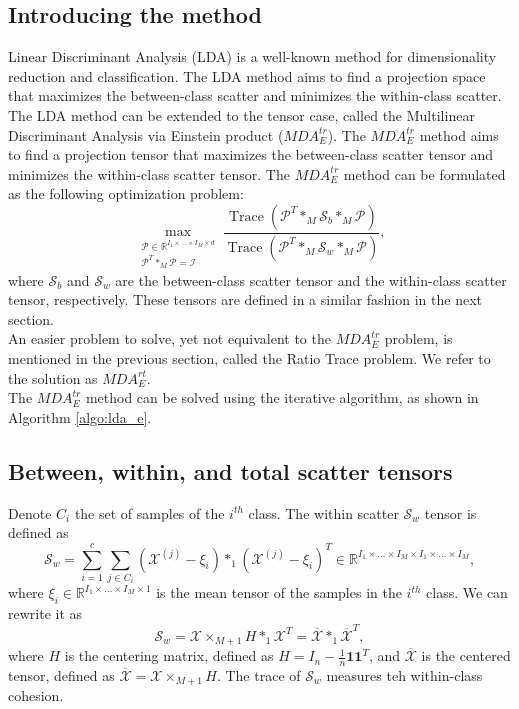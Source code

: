 \documentclass{siamltex}
\begin{document}
\subsection{Introducing the method}
Linear Discriminant Analysis (LDA) is a well-known method for dimensionality reduction and classification. The LDA method aims to find a projection space that maximizes the between-class scatter and minimizes the within-class scatter. The LDA method can be extended to the tensor case, called the Multilinear Discriminant Analysis via Einstein product ($MDA_E^{tr}$). The $MDA_E^{tr}$ method aims to find a projection tensor that maximizes the between-class scatter tensor and minimizes the within-class scatter tensor. The $MDA_E^{tr}$ method can be formulated as the following optimization problem:
\begin{equation}
\label{eq:lda_e}
\max_{\substack{\mathcal{P} \in \mathbb{R}^{I_1 \times \ldots \times I_M \times d}\\ \mathcal{P}^T *_M \mathcal{P}=\mathcal{I}}}\frac{\operatorname{Trace}(\mathcal{P}^T *_M \mathcal{S}_b *_M \mathcal{P})}{\operatorname{Trace}(\mathcal{P}^T *_M \mathcal{S}_w *_M \mathcal{P})},
\end{equation}
where $\mathcal{S}_b$ and $\mathcal{S}_w$ are the between-class scatter tensor and the within-class scatter tensor, respectively. These tensors are defined in a similar fashion in the next section.\\
An easier problem to solve, yet not equivalent to the $MDA_E^{tr}$ problem, is mentioned in the previous section, called the Ratio Trace problem. We refer to the solution as $MDA_E^{rt}$.\\
The $MDA_E^{tr}$ method can be solved using the iterative algorithm, as shown in Algorithm \ref{algo:lda_e}.
%
\subsection{Between, within, and total scatter tensors}
Denote $C_i$ the set of samples of the $i^{th}$ class. The within scatter $\mathcal{S}_w$ tensor is defined as
\begin{equation}
\mathcal{S}_w=\sum_{i=1}^{c} \sum_{j\in C_i} (\mathcal{X}^{(j)}-\xi_i) *_1 (\mathcal{X}^{(j)}-\xi_i)^T \in \mathbb{R}^{I_1 \times \ldots \times I_M \times I_1 \times \ldots \times I_M},
\end{equation}
where $\xi_i \in \mathbb{R}^{I_1 \times \ldots \times I_M \times 1}$ is the mean tensor of the samples in the $i^{th}$ class. We can rewrite it as
\begin{equation}
\mathcal{S}_w= \mathcal{X} \times_{M+1} H *_1 \mathcal{X}^T= \overline{\mathcal{X}} *_1 \overline{\mathcal{X}}^T,
\end{equation}
where $H$ is the centering matrix, defined as $H=I_n-\frac{1}{n} \mathbf{1}\mathbf{1}^T$, and $\overline{\mathcal{X}}$ is the centered tensor, defined as $\overline{\mathcal{X}}=\mathcal{X} \times_{M+1} H$.
The trace of $\mathcal{S}_w$ measures teh within-class cohesion.\\
\end{document}
